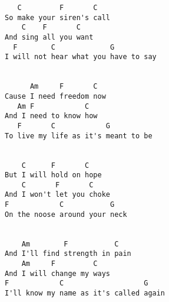 \documentclass[leqno]{memoir}
\begin{document}
\begin{verbatim}
   C         F       C  
So make your siren's call
    C    F       C  
And sing all you want
  F        C             G
I will not hear what you have to say


      Am     F       C  
Cause I need freedom now
   Am F            C  
And I need to know how
   F       C            G 
To live my life as it's meant to be


    C      F       C  
But I will hold on hope
    C       F       C  
And I won't let you choke
F            C           G
On the noose around your neck


    Am        F           C
And I'll find strength in pain
    Am     F         C
And I will change my ways
F            C                   G
I'll know my name as it's called again

\end{verbatim}
\newpage
\end{document}
